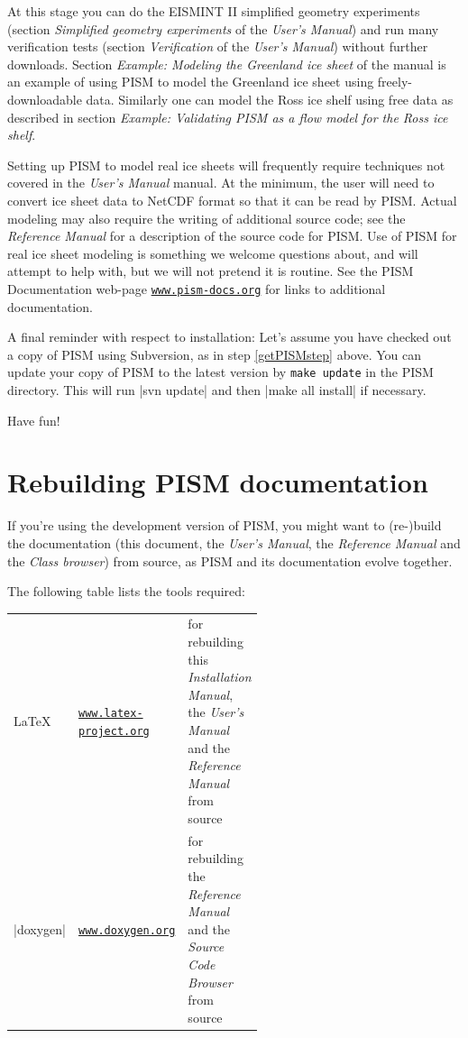 \documentclass[11pt,final]{amsart}
\renewcommand{\t}[1]{\texttt{#1}}
\begin{document}
At this stage you can do the EISMINT II simplified geometry experiments (section \emph{Simplified geometry experiments} of the
\emph{User's Manual}) and run many verification tests (section \emph{Verification} of the \emph{User's Manual}) without further
downloads. Section \emph{Example: Modeling the Greenland ice sheet} of the manual is an example of using PISM to model the
Greenland ice sheet using freely-downloadable data. Similarly one can model the Ross ice shelf using free data as described in
section \emph{Example: Validating PISM as a flow model for the Ross ice shelf}.

Setting up PISM to model real ice sheets will frequently require techniques not covered in the \emph{User's Manual} manual. At the
minimum, the user will need to convert ice sheet data to NetCDF format so that it can be read by PISM. Actual modeling may also
require the writing of additional source code; see the \emph{Reference Manual} for a description of the source code for PISM. Use
of PISM for real ice sheet modeling is something we welcome questions about, and will attempt to help with, but we will not
pretend it is routine. See the PISM Documentation web-page \href{http://www.pism-docs.org/}{\t{www.pism-docs.org}} for links to
additional documentation.

A final reminder with respect to installation: Let's assume you have checked out a copy of PISM using Subversion, as in step
\ref{getPISMstep} above. You can update your copy of PISM to the latest version by \verb|make update| in the PISM directory. This
will run |svn update| and then |make all install| if necessary.

Have fun!

\section{Rebuilding PISM documentation}
\label{sec:docs}

If you're using the development version of PISM, you might want to (re-)build the documentation (this document, the \emph{User's
  Manual}, the \emph{Reference Manual} and the \emph{Class browser}) from source, as PISM and its documentation evolve together.

The following table lists the tools required:
\begin{center}
  \begin{tabular*}{0.9\linewidth}{llp{0.55\linewidth}}
    \hline
    \LaTeX & \href{http://www.latex-project.org/}{\t{www.latex-project.org}} &  for rebuilding this \emph{Installation Manual}, the \emph{User's Manual} and the \emph{Reference Manual} from source\\
    |doxygen|\index{doxygen} & \href{http://www.stack.nl/~dimitri/doxygen/}{\t{www.doxygen.org}} &  for rebuilding the \emph{Reference Manual} and the \emph{Source Code Browser} from source  \\
    \hline
  \end{tabular*}
\end{center}
\end{document}
